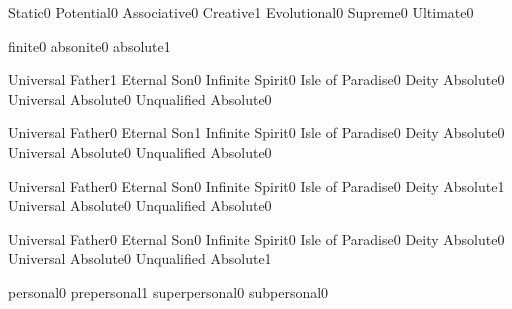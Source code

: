   {Static}{0}
  {Potential}{0}
  {Associative}{0}
  {Creative}{1}
  {Evolutional}{0}
  {Supreme}{0}
  {Ultimate}{0}
\qstop


  {finite}{0}
  {absonite}{0}
  {absolute}{1}
\qstop


  {Universal Father}{1}
  {Eternal Son}{0}
  {Infinite Spirit}{0}
  {Isle of Paradise}{0}
  {Deity Absolute}{0}
  {Universal Absolute}{0}
  {Unqualified Absolute}{0}
\qstop

  {Universal Father}{0}
  {Eternal Son}{1}
  {Infinite Spirit}{0}
  {Isle of Paradise}{0}
  {Deity Absolute}{0}
  {Universal Absolute}{0}
  {Unqualified Absolute}{0}
\qstop

  {Universal Father}{0}
  {Eternal Son}{0}
  {Infinite Spirit}{0}
  {Isle of Paradise}{0}
  {Deity Absolute}{1}
  {Universal Absolute}{0}
  {Unqualified Absolute}{0}
\qstop

  {Universal Father}{0}
  {Eternal Son}{0}
  {Infinite Spirit}{0}
  {Isle of Paradise}{0}
  {Deity Absolute}{0}
  {Universal Absolute}{0}
  {Unqualified Absolute}{1}
\qstop


  {personal}{0}
  {prepersonal}{1}
  {superpersonal}{0}
  {subpersonal}{0}
\qstop



